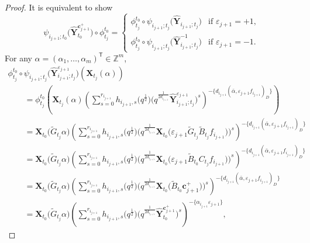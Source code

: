 \documentclass[pdftex]{sigma}
\numberwithin{equation}{section}
\begin{document}
\begin{proof}
It is equivalent to show
 \[
 \psi_{i_{j+1};t_{0}}\bigl(\mathbf{\hat{Y}}_{t_{0}}^{\mathbf{c}_{j+1}^{+}}\bigr)\circ\phi_{t_{j}}^{t_{0}}=\begin{cases}
 \phi_{t_{j}}^{t_{0}}\circ\psi_{i_{j+1};t_{j}}\bigl(\mathbf{\hat{Y}}_{i_{j+1};t_{j}}\bigr) & \text{if $\varepsilon_{j+1}=+1$},\\
 \phi_{t_{j}}^{t_{0}}\circ\psi_{i_{j+1};t_{j}}\bigl(\mathbf{\hat{Y}}^{-1}_{i_{j+1};t_{j}}\bigr) & \text{if $\varepsilon_{j+1}=-1$.}
 \end{cases}
 \]
 For any $\alpha=(\alpha_{1},\dots,\alpha_{m})^{\mathsf T}\in\mathbb{Z}^{m}$,
 \begin{gather*}
  \phi_{t_{j}}^{t_{0}}\circ\psi_{i_{j+1};t_{j}}\bigl(\mathbf{\hat{Y}}_{i_{j+1};t_{j}}^{\varepsilon_{j+1}}\bigr)(\mathbf{X}_{t_{j}}(\alpha))\\
  \qquad=\phi_{t_{j}}^{t_{0}}\left(\mathbf{X}_{t_{j}}(\alpha)\left(\sum\limits_{s=0}^{r_{i_{j+1}}} h_{i_{j+1},s}\bigl(q^{\frac{1}{2}}\bigr)\bigl(q^{\frac{1}{2d_{i_{j+1}}}}\mathbf{\hat{Y}}_{i_{j+1};t_{j}}^{\varepsilon_{j+1}}\bigr)^{s}\right)^{-\{d_{i_{j+1}}(\bar{\alpha},\varepsilon_{j+1}f_{i_{j+1}})_D\}}\right)\\
 \qquad =\mathbf{X}_{t_{0}}\bigl(\tilde{G}_{t_{j}}\alpha\bigr)\left(\sum\limits_{s=0}^{r_{i_{j+1}}} h_{i_{j+1},s}\bigl(q^{\frac{1}{2}}\bigr)\bigl(q^{\frac{1}{2d_{i_{j+1}}}}\mathbf{X}_{t_0}\bigl(\varepsilon_{j+1}\tilde{G}_{t_{j}}\tilde{B}_{t_{j}}f_{i_{j+1}}\bigr)\bigr)^{s}\right)^{-\{d_{i_{j+1}}(\bar{\alpha},\varepsilon_{j+1}f_{i_{j+1}})_D\}}\\
 \qquad =\mathbf{X}_{t_{0}}\bigl(\tilde{G}_{t_{j}}\alpha\bigr)\left(\sum\limits_{s=0}^{r_{i_{j+1}}} h_{i_{j+1},s}\bigl(q^{\frac{1}{2}}\bigr)\bigl(q^{\frac{1}{2d_{i_{j+1}}}}\mathbf{X}_{t_0}\bigl(\varepsilon_{j+1}\tilde{B}_{t_{0}}C_{t_{j}}f_{i_{j+1}}\bigr)\bigr)^{s}\right)^{-\{d_{i_{j+1}}(\bar{\alpha},\varepsilon_{j+1}f_{i_{j+1}})_D\}}\\
 \qquad =\mathbf{X}_{t_{0}}\bigl(\tilde{G}_{t_{j}}\alpha\bigr)\left(\sum\limits_{s=0}^{r_{i_{j+1}}} h_{i_{j+1},s}\bigl(q^{\frac{1}{2}}\bigr)\bigl(q^{\frac{1}{2d_{i_{j+1}}}}\mathbf{X}_{t_0}\bigl(\tilde{B}_{t_{0}}\mathbf{c}_{j+1}^{+}\bigr)\bigr)^{s}\right)^{-\{d_{i_{j+1}}(\bar{\alpha},\varepsilon_{j+1}f_{i_{j+1}})_D\}}\\
 \qquad =\mathbf{X}_{t_{0}}\bigl(\tilde{G}_{t_{j}}\alpha\bigr)\left(\sum\limits_{s=0}^{r_{i_{j+1}}} h_{i_{j+1},s}\bigl(q^{\frac{1}{2}}\bigr)\bigl(q^{\frac{1}{2d_{i_{j+1}}}}\mathbf{\hat{Y}}_{t_{0}}^{\mathbf{c}_{j+1}^{+}}\bigr)^{s}\right)^{-\{\alpha_{i_{j+1}}\varepsilon_{j+1}\}},

\end{gather*}
\end{proof}
\end{document}
